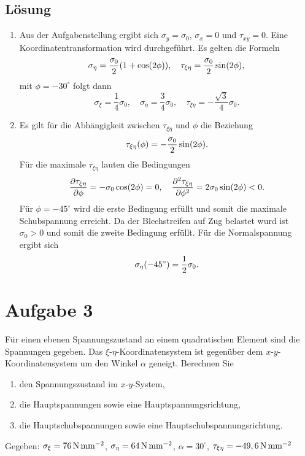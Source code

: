 \documentclass{exercise}
\begin{document}
    \subsection*{Lösung}
    \begin{enumerate}
        \item Aus der Aufgabenstellung ergibt sich \(\sigma_y = \sigma_0\), \(\sigma_x = 0\) und \(\tau_{xy} = 0\).
        Eine Koordinatentransformation wird durchgeführt.
        Es gelten die Formeln
        \[
            \sigma_\eta = \frac{\sigma_0}{2}\parentheses*{1 + \cos\parentheses*{2\phi}}, \quad \tau_{\xi\eta} = \frac{\sigma_0}{2}\sin\parentheses*{2\phi},
        \]
        mit \(\phi = -30^\circ\) folgt dann
        \[
            \sigma_\xi = \frac{1}{4}\sigma_0, \quad \sigma_\eta = \frac{3}{4}\sigma_0, \quad \tau_{\xi\eta} = -\frac{\sqrt{3}}{4}\sigma_0.
        \]
        \item Es gilt für die Abhängigkeit zwischen \(\tau_{\xi\eta}\) und \(\phi\) die Beziehung
        \[
            \tau_{\xi\eta}\parentheses*{\phi} = -\frac{\sigma_0}{2}\sin\parentheses*{2\phi}.
        \]
        Für die maximale \(\tau_{\xi\eta}\) lauten die Bedingungen
        \[
            \frac{\partial\tau_{\xi\eta}}{\partial\phi} = -\sigma_0\cos\parentheses*{2\phi} = 0, \quad \frac{\partial^2\tau_{\xi\eta}}{\partial\phi^2} = 2\sigma_0\sin\parentheses*{2\phi} < 0.
        \]
        Für \(\phi = -45^\circ\) wird die erste Bedingung erfüllt und somit die maximale Schubspannung erreicht.
        Da der Blechstreifen auf Zug belastet wurd ist \(\sigma_0 > 0\) und somit die zweite Bedingung erfüllt.
        Für die Normalspannung ergibt sich
        \[
            \sigma_\eta\parentheses*{-45^\circ} = \frac{1}{2}\sigma_0.
        \]
    \end{enumerate}


    \clearpage
    \section*{Aufgabe 3}

    \begin{problem}
        Für einen ebenen Spannungszustand an einem quadratischen Element sind die Spannungen gegeben.
        Das \(\xi\)-\(\eta\)-Koordinatensystem ist gegenüber dem \(x\)-\(y\)-Koordinatensystem um den Winkel \(\alpha\) geneigt.
        Berechnen Sie
        \begin{enumerate}
            \item den Spannungszustand im \(x\)-\(y\)-System,
            \item die Hauptspannungen sowie eine Hauptspannungsrichtung,
            \item die Hauptschubspannungen sowie eine Hauptschubspannungsrichtung.
        \end{enumerate}
        Gegeben: \(\sigma_\xi = 76\,\si{\newton\per\milli\meter\squared}\), \(\sigma_\eta = 64\,\si{\newton\per\milli\meter\squared}\), \(\alpha = 30^\circ\), \(\tau_{\xi\eta} = -49,6\,\si{\newton\per\milli\meter\squared}\)
    \end{problem}
\end{document}
